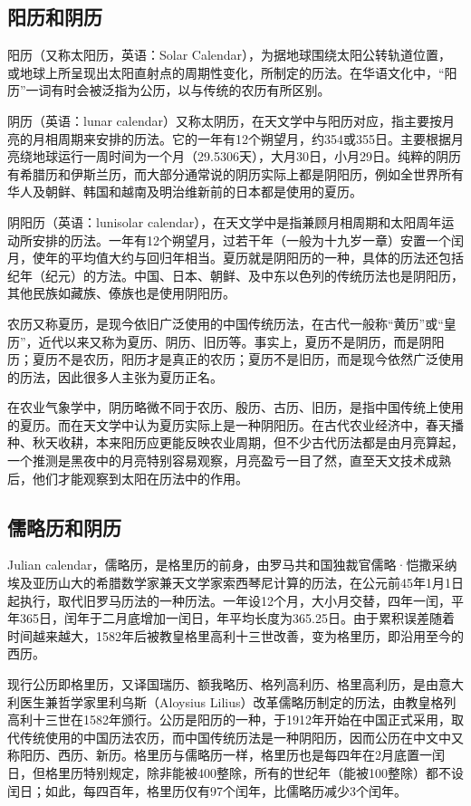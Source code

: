 \subsection{阳历和阴历}
阳历（又称太阳历，英语：Solar Calendar），为据地球围绕太阳公转轨道位置，或地球上所呈现出太阳直射点的周期性变化，所制定的历法。在华语文化中，“阳历”一词有时会被泛指为公历，以与传统的农历有所区别。

阴历（英语：lunar calendar）又称太阴历，在天文学中与阳历对应，指主要按月亮的月相周期来安排的历法。它的一年有12个朔望月，约354或355日。主要根据月亮绕地球运行一周时间为一个月（29.5306天），大月30日，小月29日。纯粹的阴历有希腊历和伊斯兰历，而大部分通常说的阴历实际上都是阴阳历，例如全世界所有华人及朝鲜、韩国和越南及明治维新前的日本都是使用的夏历。

阴阳历（英语：lunisolar calendar），在天文学中是指兼顾月相周期和太阳周年运动所安排的历法。一年有12个朔望月，过若干年（一般为十九岁一章）安置一个闰月，使年的平均值大约与回归年相当。夏历就是阴阳历的一种，具体的历法还包括纪年（纪元）的方法。中国、日本、朝鲜、及中东以色列的传统历法也是阴阳历，其他民族如藏族、傣族也是使用阴阳历。

农历又称夏历，是现今依旧广泛使用的中国传统历法，在古代一般称“黄历”或“皇历”，近代以来又称为夏历、阴历、旧历等。事实上，夏历不是阴历，而是阴阳历；夏历不是农历，阳历才是真正的农历；夏历不是旧历，而是现今依然广泛使用的历法，因此很多人主张为夏历正名。

在农业气象学中，阴历略微不同于农历、殷历、古历、旧历，是指中国传统上使用的夏历。而在天文学中认为夏历实际上是一种阴阳历。在古代农业经济中，春天播种、秋天收耕，本来阳历应更能反映农业周期，但不少古代历法都是由月亮算起，一个推测是黑夜中的月亮特别容易观察，月亮盈亏一目了然，直至天文技术成熟后，他们才能观察到太阳在历法中的作用。

\subsection{儒略历和阴历}
Julian calendar，儒略历，是格里历的前身，由罗马共和国独裁官儒略·恺撒采纳埃及亚历山大的希腊数学家兼天文学家索西琴尼计算的历法，在公元前45年1月1日起执行，取代旧罗马历法的一种历法。一年设12个月，大小月交替，四年一闰，平年365日，闰年于二月底增加一闰日，年平均长度为365.25日。由于累积误差随着时间越来越大，1582年后被教皇格里高利十三世改善，变为格里历，即沿用至今的西历。

现行公历即格里历，又译国瑞历、额我略历、格列高利历、格里高利历，是由意大利医生兼哲学家里利乌斯（Aloysius Lilius）改革儒略历制定的历法，由教皇格列高利十三世在1582年颁行。公历是阳历的一种，于1912年开始在中国正式采用，取代传统使用的中国历法农历，而中国传统历法是一种阴阳历，因而公历在中文中又称阳历、西历、新历。格里历与儒略历一样，格里历也是每四年在2月底置一闰日，但格里历特别规定，除非能被400整除，所有的世纪年（能被100整除）都不设闰日；如此，每四百年，格里历仅有97个闰年，比儒略历减少3个闰年。

